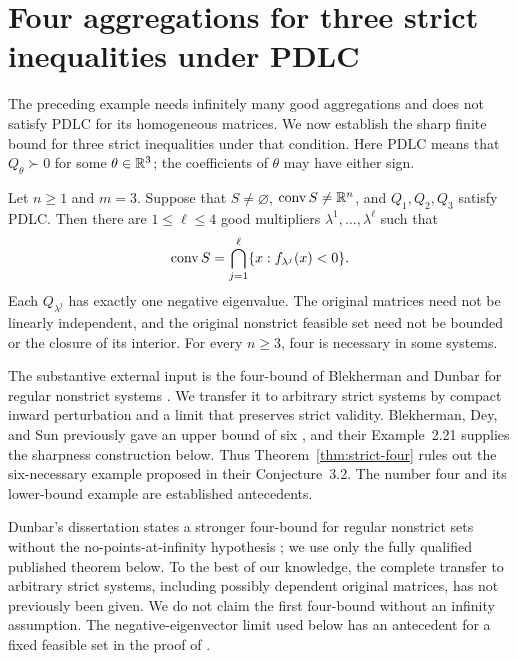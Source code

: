 \section{Four aggregations for three strict inequalities under PDLC}
\label{sec:four-aggregation}

The preceding example needs infinitely many good aggregations and does
not satisfy PDLC for its homogeneous matrices. We now establish the
sharp finite bound for three strict inequalities under that condition.
Here PDLC means that $Q_\theta\succ0$ for some $\theta\in\mathbb R^3$;
the coefficients of $\theta$ may have either sign.

\begin{theorem}
\label{thm:strict-four}
Let $n\geq1$ and $m=3$. Suppose that $S\ne\varnothing$,
$\operatorname{conv} S\ne\mathbb R^n$, and $Q_1,Q_2,Q_3$ satisfy PDLC. Then there
are $1\leq\ell\leq4$ good multipliers $\lambda^1,\ldots,\lambda^\ell$
such that
\begin{equation}\label{eq:strict-four}
 \operatorname{conv} S=\bigcap_{j=1}^{\ell}\{x:f_{\lambda^j}(x)<0\}.
\end{equation}
Each $Q_{\lambda^j}$ has exactly one negative eigenvalue.
The original matrices need not be linearly independent, and the original
nonstrict feasible set need not be bounded or the closure of its interior.
For every $n\geq3$, four is necessary in some systems.
\end{theorem}

The substantive external input is the four-bound of Blekherman and
Dunbar for regular nonstrict systems \citep[Theorem~1.4]{BD2025,BDpreprint}.
We transfer it to arbitrary strict systems by compact inward perturbation
and a limit that preserves strict validity. Blekherman, Dey, and Sun
previously gave an upper bound of six \citep[Corollary~2.20]{BDSpreprint},
and their Example~2.21 supplies the sharpness construction below. Thus
Theorem~\ref{thm:strict-four} rules out the six-necessary example
proposed in their Conjecture~3.2. The number four and its lower-bound
example are established antecedents.

Dunbar's dissertation states a stronger four-bound for regular nonstrict
sets without the no-points-at-infinity hypothesis
\citep[Theorem~5.0.5]{Dunbar2025Thesis}; we use only the fully qualified
published theorem below. To the best of our knowledge, the complete
transfer to arbitrary strict systems, including possibly dependent
original matrices, has not previously been given. We do not claim the
first four-bound without an infinity assumption. The negative-eigenvector
limit used below has an antecedent for a fixed feasible set in the proof
of \citet[Proposition~3.15, Section~8]{BDpreprint}.

